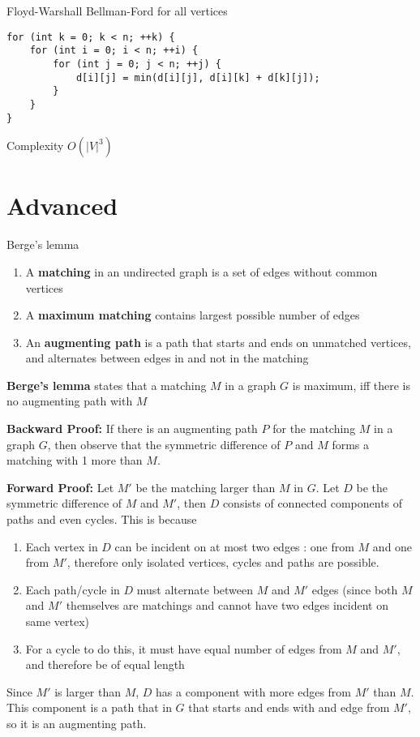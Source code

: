 \documentclass[titlepage, 12pt]{book}
\begin{document}
\begin{algorithm}{Floyd-Warshall}{}
Bellman-Ford for all vertices
\begin{verbatim}
for (int k = 0; k < n; ++k) {
    for (int i = 0; i < n; ++i) {
        for (int j = 0; j < n; ++j) {
            d[i][j] = min(d[i][j], d[i][k] + d[k][j]); 
        }
    }
}
\end{verbatim}

Complexity $O(|V|^3)$

\end{algorithm}

\section{Advanced}

\begin{theorem}{Berge's lemma}{}
    \begin{enumerate}
        \item A \textbf{matching} in an undirected graph is a set of edges without
            common vertices
        \item A \textbf{maximum matching} contains largest possible number of edges
        \item An \textbf{augmenting path} is a path that starts and ends on
            unmatched vertices, and alternates between edges in and not in the
            matching
    \end{enumerate}
    \textbf{Berge's lemma} states that a matching $M$ in a graph $G$ is maximum,
    iff there is no augmenting path with $M$
\end{theorem}
\textbf{Backward Proof:}
If there is an augmenting path $P$ for the matching $M$ in a graph $G$, then
observe that the symmetric difference of $P$ and $M$ forms a matching with 1
more than $M$.

\textbf{Forward Proof:}
Let $M'$ be the matching larger than $M$ in $G$. Let $D$ be the symmetric
difference of $M$ and $M'$, then $D$ consists of connected components of paths
and even cycles. This is because

\begin{enumerate}
    \item Each vertex in $D$ can be incident on at most two edges : one from $M$
        and one from $M'$, therefore only isolated vertices, cycles and paths
        are possible.
    \item Each path/cycle in $D$ must alternate between $M$ and $M'$ edges
        (since both $M$ and $M'$ themselves are matchings and cannot have two
        edges incident on same vertex)
    \item For a cycle to do this, it must have equal number of edges from $M$
        and $M'$, and therefore be of equal length
\end{enumerate}
Since $M'$ is larger than $M$, $D$ has a component with more edges from $M'$
than $M$. This component is a path that in $G$ that starts and ends with and
edge from $M'$, so it is an augmenting path.
\end{document}
